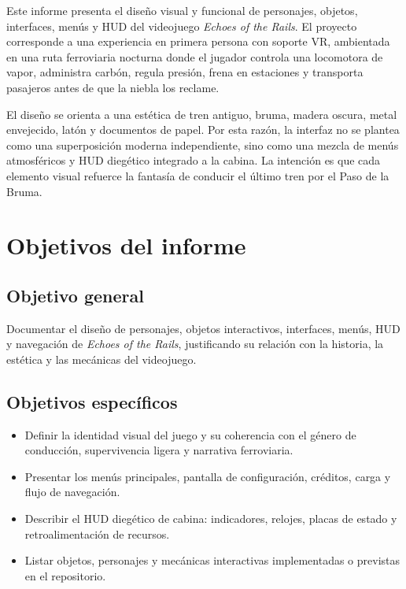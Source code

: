 \documentclass[12pt,letterpaper]{article}
\begin{document}
Este informe presenta el diseño visual y funcional de personajes, objetos, interfaces, menús y HUD del videojuego \textit{Echoes of the Rails}. El proyecto corresponde a una experiencia en primera persona con soporte VR, ambientada en una ruta ferroviaria nocturna donde el jugador controla una locomotora de vapor, administra carbón, regula presión, frena en estaciones y transporta pasajeros antes de que la niebla los reclame.

El diseño se orienta a una estética de tren antiguo, bruma, madera oscura, metal envejecido, latón y documentos de papel. Por esta razón, la interfaz no se plantea como una superposición moderna independiente, sino como una mezcla de menús atmosféricos y HUD diegético integrado a la cabina. La intención es que cada elemento visual refuerce la fantasía de conducir el último tren por el Paso de la Bruma.

\section{Objetivos del informe}

\subsection{Objetivo general}

Documentar el diseño de personajes, objetos interactivos, interfaces, menús, HUD y navegación de \textit{Echoes of the Rails}, justificando su relación con la historia, la estética y las mecánicas del videojuego.

\subsection{Objetivos específicos}

\begin{itemize}
  \item Definir la identidad visual del juego y su coherencia con el género de conducción, supervivencia ligera y narrativa ferroviaria.
  \item Presentar los menús principales, pantalla de configuración, créditos, carga y flujo de navegación.
  \item Describir el HUD diegético de cabina: indicadores, relojes, placas de estado y retroalimentación de recursos.
  \item Listar objetos, personajes y mecánicas interactivas implementadas o previstas en el repositorio.
\end{itemize}
\end{document}
